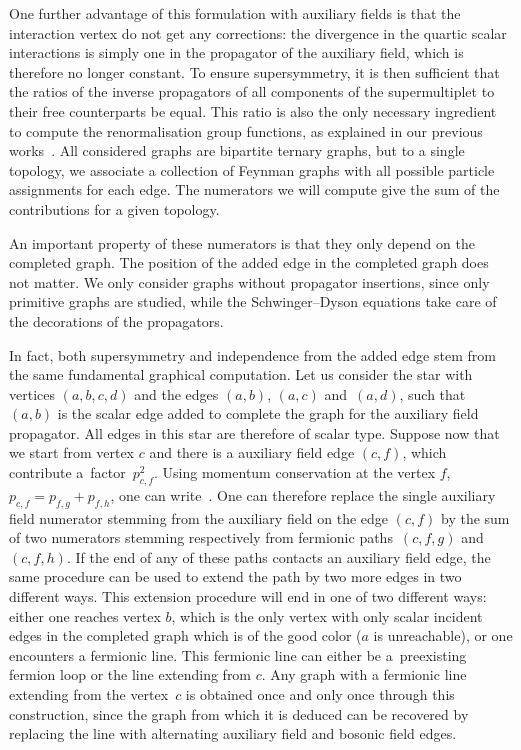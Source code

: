\documentclass[pdftex]{sigma}
\numberwithin{equation}{section}
\def\dirp{{\slash \mkern -9mu p}}
\begin{document}
One further advantage of this formulation with auxiliary fields is that the interaction vertex do not get any corrections:
the divergence in the quartic scalar interactions is simply one in the propagator of the auxiliary field, which is
therefore no longer constant.
To ensure supersymmetry, it is then sufficient that the ratios of the inverse propagators of all components of the
supermultiplet to their free counterparts be equal. This ratio is also the only necessary ingredient to compute the
renormalisation group functions, as explained in our previous works~\cite{BeSc08,BeSc12}. All considered graphs are
bipartite ternary graphs, but to a single topology, we associate a collection of
Feynman graphs with all possible particle assignments for each edge. The numerators we will compute give the sum of the
contributions for a given topology.

An important property of these numerators is that they only depend on the completed graph. The position of
the added edge in the completed graph does not matter. We only consider graphs without propagator
insertions, since only primitive graphs are studied,
while the Schwinger--Dyson equations take care of the decorations of the propagators.

In fact, both supersymmetry and independence from the added edge stem from the same fundamental graphical computation. Let
us consider the star with vertices $(a,b,c,d)$ and the edges $(a,b)$, $(a,c)$ and~$(a,d)$, such that $(a,b)$ is the scalar edge added to complete the graph for the auxiliary field propagator. All edges in this star are therefore of scalar type. Suppose now that we start from vertex $c$ and there is a auxiliary field edge $(c,f)$, which contribute a~factor~$p_{c,f}^2$. Using momentum conservation at the vertex $f$, $p_{c,f} = p_{f,g}+p_{f,h}$, one can write~\smash{$p_{c,f}^2 = \dirp_{c,f} \dirp_{f,g} + \dirp_{c,f} \dirp_{f,h}$}.
One can therefore replace the single auxiliary field numerator stemming from the auxiliary field on the edge $(c,f)$ by
the sum of two numerators stemming respectively from fermionic paths~$(c,f,g)$ and $(c,f,h)$. If the end of any of
these paths contacts an auxiliary field edge, the same procedure can be used to extend the path by two more edges in two
different ways. This extension procedure will end in one of two different ways: either one reaches vertex $b$, which is
the only vertex with only scalar incident edges in the completed graph which is of the good color ($a$ is unreachable),
or one encounters a fermionic line. This fermionic line can either be a~preexisting fermion loop or the line extending
from $c$. Any graph with a fermionic line extending from the vertex~$c$ is obtained once and only once through this construction, since the graph from which it is deduced can be recovered by replacing the line with alternating auxiliary field and bosonic field edges.
\end{document}

